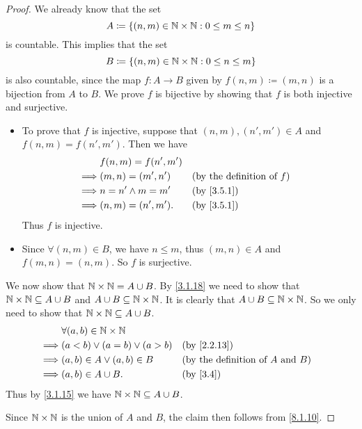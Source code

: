 \begin{proof}
  We already know that the set
  \[
    A \coloneqq \left\lbrace(n, m) \in \mathbb{N} \times \mathbb{N} : 0 \leq m \leq n\right\rbrace
  \]
  is countable.
  This implies that the set
  \[
    B \coloneqq \left\lbrace(n, m) \in \mathbb{N} \times \mathbb{N} : 0 \leq n \leq m\right\rbrace
  \]
  is also countable, since the map \(f : A \to B\) given by \(f(n, m) \coloneqq (m, n)\) is a bijection from \(A\) to \(B\).
  We prove \(f\) is bijective by showing that \(f\) is both injective and surjective.
  \begin{itemize}
    \item To prove that \(f\) is injective, suppose that \((n, m), (n', m') \in A\) and \(f(n, m) = f(n', m')\).
          Then we have
          \begin{align*}
                     & f(n, m) = f(n', m')                                          \\
            \implies & (m, n) = (m', n')   &  & \text{(by the definition of \(f\))} \\
            \implies & n = n' \land m = m' &  & \by{3.5.1}                          \\
            \implies & (n, m) = (n', m').  &  & \by{3.5.1}
          \end{align*}
          Thus \(f\) is injective.
    \item Since \(\forall (n, m) \in B\), we have \(n \leq m\), thus \((m, n) \in A\) and \(f(m, n) = (n, m)\).
          So \(f\) is surjective.
  \end{itemize}

  We now show that \(\mathbb{N} \times \mathbb{N} = A \cup B\).
  By \cref{3.1.18} we need to show that \(\mathbb{N} \times \mathbb{N} \subseteq A \cup B\) and \(A \cup B \subseteq \mathbb{N} \times \mathbb{N}\).
  It is clearly that \(A \cup B \subseteq \mathbb{N} \times \mathbb{N}\).
  So we only need to show that \(\mathbb{N} \times \mathbb{N} \subseteq A \cup B\).
  \begin{align*}
             & \forall (a, b) \in \N \times \N                                                      \\
    \implies & (a < b) \lor (a = b) \lor (a > b) &  & \by{2.2.13}                                   \\
    \implies & (a, b) \in A \lor (a, b) \in B    &  & \text{(by the definition of \(A\) and \(B\))} \\
    \implies & (a, b) \in A \cup B.              &  & \by{3.4}
  \end{align*}
  Thus by \cref{3.1.15} we have \(\mathbb{N} \times \mathbb{N} \subseteq A \cup B\).

  Since \(\mathbb{N} \times \mathbb{N}\) is the union of \(A\) and \(B\), the claim then follows from \cref{8.1.10}.
\end{proof}

